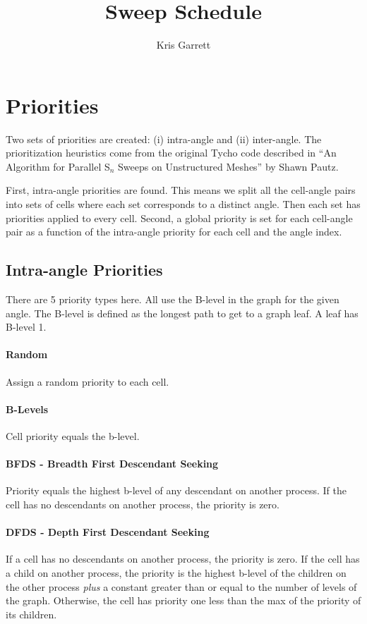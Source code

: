 \documentclass[12pt,letterpaper]{article}
\author{Kris Garrett}
\title{Sweep Schedule}
\begin{document}
\maketitle

\section{Priorities}
Two sets of priorities are created: (i) intra-angle and (ii) inter-angle.
The prioritization heuristics come from the original Tycho code described in ``An Algorithm for Parallel S$_n$ Sweeps on Unstructured Meshes'' by Shawn Pautz.

First, intra-angle priorities are found.
This means we split all the cell-angle pairs into sets of cells where each set corresponds to a distinct angle.
Then each set has priorities applied to every cell.
Second, a global priority is set for each cell-angle pair as a function of the intra-angle priority for each cell and the angle index.



\subsection{Intra-angle Priorities}
There are 5 priority types here.
All use the B-level in the graph for the given angle.
The B-level is defined as the longest path to get to a graph leaf.
A leaf has B-level 1.

\paragraph{Random}
Assign a random priority to each cell.

\paragraph{B-Levels}
Cell priority equals the b-level.

\paragraph{BFDS - Breadth First Descendant Seeking}
Priority equals the highest b-level of any descendant on another process.
If the cell has no descendants on another process, the priority is zero.

\paragraph{DFDS - Depth First Descendant Seeking}
If a cell has no descendants on another process, the priority is zero.
If the cell has a child on another process, the priority is the highest b-level of the children on the other process \textit{plus} a constant greater than or equal to the number of levels of the graph.
Otherwise, the cell has priority one less than the max of the priority of its children.
\end{document}
